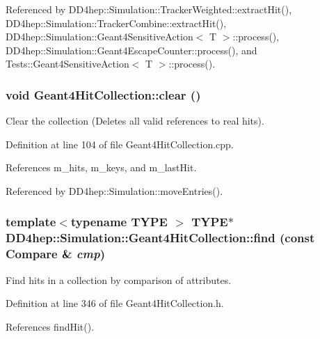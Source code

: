 Referenced by DD4hep::Simulation::TrackerWeighted::extractHit(), DD4hep::Simulation::TrackerCombine::extractHit(), DD4hep::Simulation::Geant4SensitiveAction$<$ T $>$::process(), DD4hep::Simulation::Geant4EscapeCounter::process(), and Tests::Geant4SensitiveAction$<$ T $>$::process().\hypertarget{class_d_d4hep_1_1_simulation_1_1_geant4_hit_collection_a02e7c1123e909477f4b7951e94c10768}{
\subsubsection[{clear}]{\setlength{\rightskip}{0pt plus 5cm}void Geant4HitCollection::clear ()}}
\label{class_d_d4hep_1_1_simulation_1_1_geant4_hit_collection_a02e7c1123e909477f4b7951e94c10768}


Clear the collection (Deletes all valid references to real hits). 

Definition at line 104 of file Geant4HitCollection.cpp.

References m\_\-hits, m\_\-keys, and m\_\-lastHit.

Referenced by DD4hep::Simulation::moveEntries().\hypertarget{class_d_d4hep_1_1_simulation_1_1_geant4_hit_collection_a7dfff7bafded0c36cfe093d477b1e518}{
\subsubsection[{find}]{\setlength{\rightskip}{0pt plus 5cm}template$<$typename TYPE $>$ TYPE$\ast$ DD4hep::Simulation::Geant4HitCollection::find (const {\bf Compare} \& {\em cmp})}}
\label{class_d_d4hep_1_1_simulation_1_1_geant4_hit_collection_a7dfff7bafded0c36cfe093d477b1e518}


Find hits in a collection by comparison of attributes. 

Definition at line 346 of file Geant4HitCollection.h.

References findHit().

